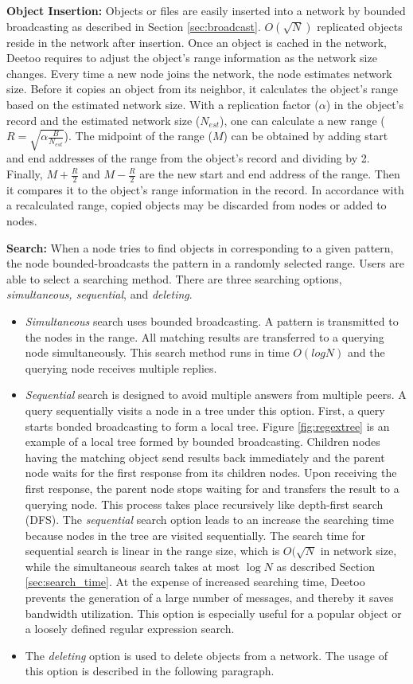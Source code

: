 \documentclass[9.5pt,journal,final,finalsubmission,twocolumn]{IEEEtran}
\begin{document}
\textbf{Object Insertion:} Objects or files are easily inserted into a network by 
bounded broadcasting as described in Section \ref{sec:broadcast}. $O(\sqrt{N})$ replicated objects 
reside in the network after insertion. 
Once an object is cached in the network, Deetoo requires to adjust the object's range information 
as the network size changes. Every time a new node joins the network, the node estimates network size. 
Before it copies an object from its neighbor, it calculates the object's range based on the 
estimated network size. With a replication factor ($\alpha$) in the object's record and the 
estimated network size ($N_{est}$), one can calculate a new range ($R=\sqrt{\alpha \frac{B}{N_{est}}}$).
The midpoint of the range ($M$) can be obtained by adding start and end addresses of the 
range from the object's record
and dividing by 2. Finally, $M+\frac{R}{2}$ and $M-\frac{R}{2}$ are the new start and end address 
of the range.
Then it compares it to the object's 
range information in the record. In accordance with a recalculated range, copied objects may be discarded 
from nodes or added to nodes.

\textbf{Search:}
When a node tries to find objects in corresponding to a given pattern, the node bounded-broadcasts 
the pattern in a randomly selected range. 
Users are able to select a searching method. There are three searching options, 
\textit{simultaneous, sequential}, and \textit{deleting}.
\begin{itemize}
\item \textit{Simultaneous} search uses bounded broadcasting. A pattern is transmitted 
to the nodes in the range. All matching results are transferred to a querying 
node simultaneously. This search method runs in time $O(log N)$ and the querying node 
receives multiple replies.
\item \textit{Sequential} search is designed to avoid multiple answers from multiple peers.
A query sequentially visits a node in a tree under this option. 
First, a query starts bonded broadcasting to form a local tree. 
Figure \ref{fig:regextree} is an example of a local tree formed by bounded broadcasting. 
Children nodes having the matching object send results back immediately and the 
parent node waits for the first response from its children nodes. Upon receiving 
the first response, the parent node stops waiting for and transfers the result to a querying 
node. This process takes place recursively like depth-first search (DFS). 
The \textit{sequential} search option leads to an increase the searching time because nodes in the
tree are visited sequentially. The search time for sequential search is linear
in the range size, which is $O(\sqrt{N}$ in network size, while 
the simultaneous search takes at most $\log N$ as described Section \ref{sec:search_time}.
At the expense of increased searching time, Deetoo prevents the generation of a large number of 
messages, and thereby it saves bandwidth utilization.
This option is especially useful for a popular object or a loosely defined regular expression search.
\item The \textit{deleting} option is used to delete objects from a network. 
The usage of this option is described in the following paragraph.
\end{itemize}
\end{document}
